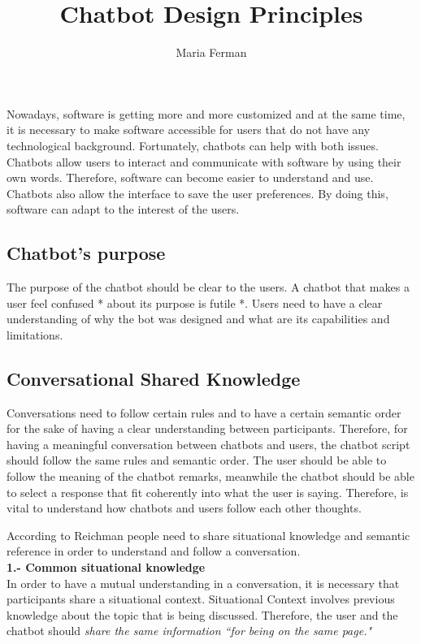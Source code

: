 \documentclass[a4paper,10pt]{article}
\title{Chatbot Design Principles}
\author{Maria Ferman}
\begin{document}
\maketitle

Nowadays, software is getting more and more customized and at the same time, it is necessary to make software accessible for users that do not have any technological background. Fortunately, chatbots can help with both issues. Chatbots allow users to interact and communicate with software by using their own words. Therefore, software can become easier to understand and use. Chatbots also allow the interface to save the user preferences. By doing this, software can adapt to the interest of the users.  

\subsection*{Chatbot's purpose}

The purpose of the chatbot should be clear to the users. A chatbot that makes a user feel confused * about its purpose is futile *. Users need to have a clear understanding of why the bot was designed and what are its capabilities and limitations. 

\subsection*{Conversational Shared Knowledge}

Conversations need to follow certain rules and to have a certain semantic order for the sake of having a clear understanding between participants. Therefore, for having a meaningful conversation between chatbots and users, the chatbot script should follow the same rules and semantic order. The user should be able to follow the meaning of the chatbot remarks, meanwhile the chatbot should be able to select a response that fit coherently into what the user is saying. Therefore, is vital to understand how chatbots and users follow each other thoughts.

According to Reichman \cite{reichman1985getting} people need to share situational knowledge and semantic reference in order to understand and follow a conversation.\\[0\baselineskip]

\textbf{1.-  Common situational knowledge}\\[0\baselineskip]
In order to have a mutual understanding in a conversation, it is necessary that participants share a situational context. Situational Context involves previous knowledge about the topic that is being discussed.  Therefore, the user and the chatbot should \textit{share the same information ``for being on the same page."} 
\end{document}

